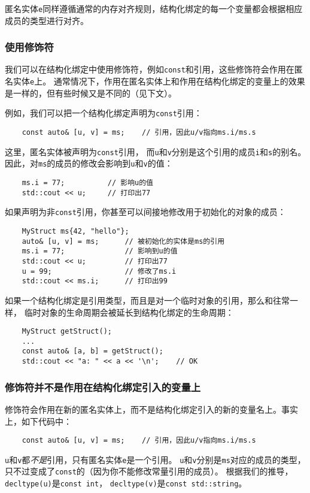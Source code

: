 匿名实体\texttt{e}同样遵循通常的内存对齐规则，结构化绑定的每一个变量都会根据相应成员的类型进行对齐。

\subsubsection{使用修饰符}
我们可以在结构化绑定中使用修饰符，例如\texttt{const}和引用，这些修饰符会作用在匿名实体\texttt{e}上。
通常情况下，作用在匿名实体上和作用在结构化绑定的变量上的效果是一样的，但有些时候又是不同的（见下文）。

例如，我们可以把一个结构化绑定声明为\texttt{const}引用：
\begin{lstlisting}
    const auto& [u, v] = ms;    // 引用，因此u/v指向ms.i/ms.s
\end{lstlisting}
这里，匿名实体被声明为\texttt{const}引用，
而\texttt{u}和\texttt{v}分别是这个引用的成员\texttt{i}和\texttt{s}的别名。
因此，对\texttt{ms}的成员的修改会影响到\texttt{u}和\texttt{v}的值：
\begin{lstlisting}
    ms.i = 77;          // 影响u的值
    std::cout << u;     // 打印出77
\end{lstlisting}
如果声明为非\texttt{const}引用，你甚至可以间接地修改用于初始化的对象的成员：
\begin{lstlisting}
    MyStruct ms{42, "hello"};
    auto& [u, v] = ms;      // 被初始化的实体是ms的引用
    ms.i = 77;              // 影响到u的值
    std::cout << u;         // 打印出77
    u = 99;                 // 修改了ms.i
    std::cout << ms.i;      // 打印出99
\end{lstlisting}
如果一个结构化绑定是引用类型，而且是对一个临时对象的引用，那么和往常一样，
临时对象的生命周期会被延长到结构化绑定的生命周期：
\begin{lstlisting}
    MyStruct getStruct();
    ...
    const auto& [a, b] = getStruct();
    std::cout << "a: " << a << '\n';    // OK
\end{lstlisting}

\subsubsection{修饰符并不是作用在结构化绑定引入的变量上}
修饰符会作用在新的匿名实体上，而不是结构化绑定引入的新的变量名上。事实上，如下代码中：
\begin{lstlisting}
    const auto& [u, v] = ms;    // 引用，因此u/v指向ms.i/ms.s
\end{lstlisting}
\texttt{u}和\texttt{v}都\emph{不是}引用，只有匿名实体\texttt{e}是一个引用。
\texttt{u}和\texttt{v}分别是\texttt{ms}对应的成员的类型，
只不过变成了\texttt{const}的（因为你不能修改常量引用的成员）。
根据我们的推导，\texttt{decltype(u)}是\texttt{const int}，
\texttt{decltype(v)}是\texttt{const std::string}。

